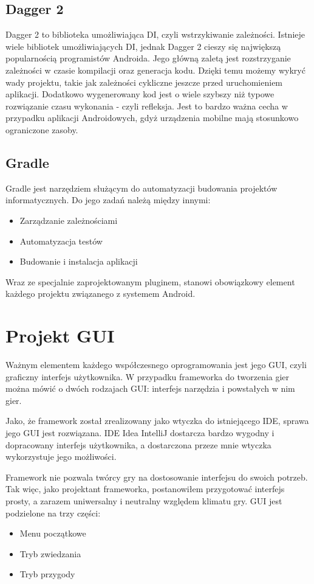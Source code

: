 \documentclass	{xmgr}
\begin{document}
\section{Dagger 2}

Dagger 2 \cite{Dagger2:2017:Doc} to biblioteka umożliwiająca DI, czyli wstrzykiwanie zależności. Istnieje wiele bibliotek umożliwiających DI, jednak Dagger 2 cieszy się największą popularnością programistów Androida. Jego główną zaletą jest rozstrzyganie zależności w czasie kompilacji oraz generacja kodu. Dzięki temu możemy wykryć wady projektu, takie jak zależności cykliczne jeszcze przed uruchomieniem aplikacji. Dodatkowo wygenerowany kod jest o wiele szybszy niż typowe rozwiązanie czasu wykonania - czyli refleksja. Jest to bardzo ważna cecha w przypadku aplikacji Androidowych, gdyż urządzenia mobilne mają stosunkowo ograniczone zasoby. 

\section{Gradle}

Gradle \cite{Gradle:2017:Doc} jest narzędziem służącym do automatyzacji budowania projektów informatycznych. Do jego zadań należą między innymi:
\begin{itemize}
	\item Zarządzanie zależnościami
	\item Automatyzacja testów
	\item Budowanie i instalacja aplikacji
\end{itemize}
Wraz ze specjalnie zaprojektowanym pluginem, stanowi obowiązkowy element każdego projektu związanego z systemem Android.

\chapter{Projekt GUI}
Ważnym elementem każdego współczesnego oprogramowania jest jego GUI, czyli graficzny interfejs użytkownika. W przypadku frameworka do tworzenia gier można mówić o dwóch rodzajach GUI: interfejs narzędzia i powstałych w nim gier. 

Jako, że framework został zrealizowany jako wtyczka do istniejącego IDE, sprawa jego GUI jest rozwiązana. IDE Idea IntelliJ dostarcza bardzo wygodny i dopracowany interfejs użytkownika, a dostarczona przeze mnie wtyczka wykorzystuje jego możliwości. 

Framework nie pozwala twórcy gry na dostosowanie interfejsu do swoich potrzeb. Tak więc, jako projektant frameworka, postanowiłem przygotować interfejs prosty, a zarazem uniwersalny i neutralny względem klimatu gry. GUI jest podzielone na trzy części:
\begin{itemize}
	\item Menu początkowe
	\item Tryb zwiedzania
	\item Tryb przygody
\end{itemize}
\end{document}

